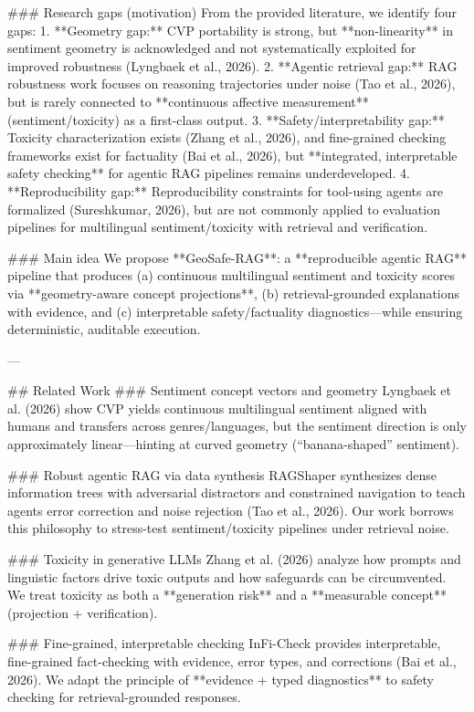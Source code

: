 ### Research gaps (motivation)
From the provided literature, we identify four gaps:
1. **Geometry gap:** CVP portability is strong, but **non-linearity** in sentiment geometry is acknowledged and not systematically exploited for improved robustness (Lyngbaek et al., 2026).
2. **Agentic retrieval gap:** RAG robustness work focuses on reasoning trajectories under noise (Tao et al., 2026), but is rarely connected to **continuous affective measurement** (sentiment/toxicity) as a first-class output.
3. **Safety/interpretability gap:** Toxicity characterization exists (Zhang et al., 2026), and fine-grained checking frameworks exist for factuality (Bai et al., 2026), but **integrated, interpretable safety checking** for agentic RAG pipelines remains underdeveloped.
4. **Reproducibility gap:** Reproducibility constraints for tool-using agents are formalized (Sureshkumar, 2026), but are not commonly applied to evaluation pipelines for multilingual sentiment/toxicity with retrieval and verification.

### Main idea
We propose **GeoSafe-RAG**: a **reproducible agentic RAG** pipeline that produces (a) continuous multilingual sentiment and toxicity scores via **geometry-aware concept projections**, (b) retrieval-grounded explanations with evidence, and (c) interpretable safety/factuality diagnostics—while ensuring deterministic, auditable execution.

---

## Related Work
### Sentiment concept vectors and geometry
Lyngbaek et al. (2026) show CVP yields continuous multilingual sentiment aligned with humans and transfers across genres/languages, but the sentiment direction is only approximately linear—hinting at curved geometry (“banana-shaped” sentiment).

### Robust agentic RAG via data synthesis
RAGShaper synthesizes dense information trees with adversarial distractors and constrained navigation to teach agents error correction and noise rejection (Tao et al., 2026). Our work borrows this philosophy to stress-test sentiment/toxicity pipelines under retrieval noise.

### Toxicity in generative LLMs
Zhang et al. (2026) analyze how prompts and linguistic factors drive toxic outputs and how safeguards can be circumvented. We treat toxicity as both a **generation risk** and a **measurable concept** (projection + verification).

### Fine-grained, interpretable checking
InFi-Check provides interpretable, fine-grained fact-checking with evidence, error types, and corrections (Bai et al., 2026). We adapt the principle of **evidence + typed diagnostics** to safety checking for retrieval-grounded responses.

